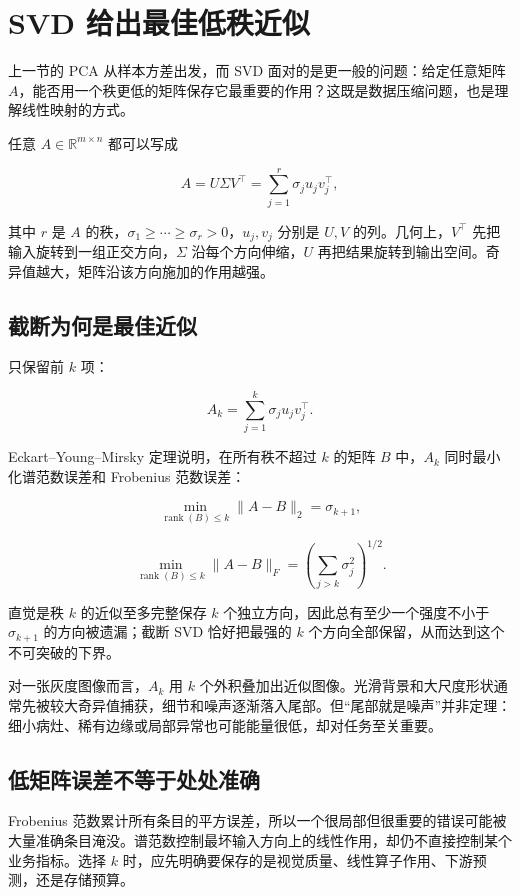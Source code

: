 \section{SVD 给出最佳低秩近似}

上一节的 PCA 从样本方差出发，而 SVD 面对的是更一般的问题：给定任意矩阵 \(A\)，能否用一个秩更低的矩阵保存它最重要的作用？这既是数据压缩问题，也是理解线性映射的方式。

任意 \(A\in\mathbb R^{m\times n}\) 都可以写成

\[
A=U\Sigma V^\top
=\sum_{j=1}^r\sigma_ju_jv_j^\top,
\]

其中 \(r\) 是 \(A\) 的秩，\(\sigma_1\ge\cdots\ge\sigma_r>0\)，\(u_j,v_j\) 分别是 \(U,V\) 的列。几何上，\(V^\top\) 先把输入旋转到一组正交方向，\(\Sigma\) 沿每个方向伸缩，\(U\) 再把结果旋转到输出空间。奇异值越大，矩阵沿该方向施加的作用越强。

\subsection{截断为何是最佳近似}

只保留前 \(k\) 项：

\[
A_k=\sum_{j=1}^k\sigma_ju_jv_j^\top.
\]

Eckart--Young--Mirsky 定理说明，在所有秩不超过 \(k\) 的矩阵 \(B\) 中，\(A_k\) 同时最小化谱范数误差和 Frobenius 范数误差：

\[
\min_{\operatorname{rank}(B)\le k}\|A-B\|_2
=\sigma_{k+1},
\]

\[
\min_{\operatorname{rank}(B)\le k}\|A-B\|_F
=\left(\sum_{j>k}\sigma_j^2\right)^{1/2}.
\]

直觉是秩 \(k\) 的近似至多完整保存 \(k\) 个独立方向，因此总有至少一个强度不小于 \(\sigma_{k+1}\) 的方向被遗漏；截断 SVD 恰好把最强的 \(k\) 个方向全部保留，从而达到这个不可突破的下界。

对一张灰度图像而言，\(A_k\) 用 \(k\) 个外积叠加出近似图像。光滑背景和大尺度形状通常先被较大奇异值捕获，细节和噪声逐渐落入尾部。但``尾部就是噪声''并非定理：细小病灶、稀有边缘或局部异常也可能能量很低，却对任务至关重要。

\subsection{低矩阵误差不等于处处准确}

Frobenius 范数累计所有条目的平方误差，所以一个很局部但很重要的错误可能被大量准确条目淹没。谱范数控制最坏输入方向上的线性作用，却仍不直接控制某个业务指标。选择 \(k\) 时，应先明确要保存的是视觉质量、线性算子作用、下游预测，还是存储预算。

